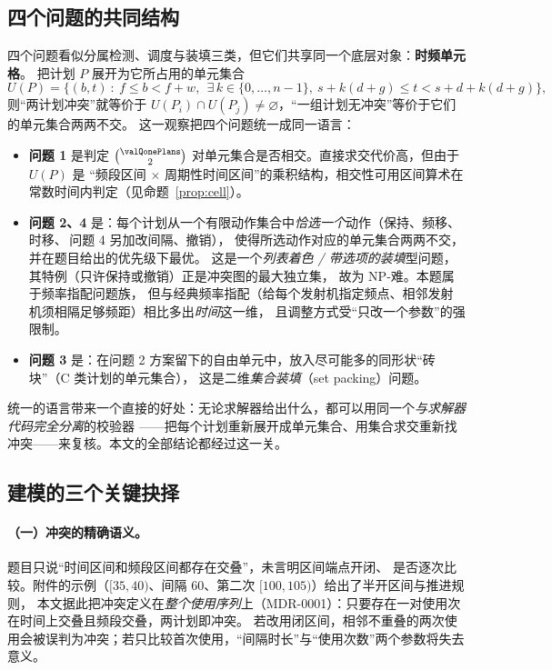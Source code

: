 \subsection{四个问题的共同结构}

四个问题看似分属检测、调度与装填三类，但它们共享同一个底层对象：\textbf{时频单元格}。
把计划 $P$ 展开为它所占用的单元集合
\[
  U(P)=\bigl\{(b,t)\ :\ f\le b<f+w,\ \ \exists\,k\in\{0,\dots,n-1\},\ s+k(d+g)\le t<s+d+k(d+g)\bigr\},
\]
则“两计划冲突”就等价于 $U(P_i)\cap U(P_j)\neq\varnothing$，“一组计划无冲突”等价于它们的单元集合两两不交。
这一观察把四个问题统一成同一语言：

\begin{itemize}[leftmargin=1.6em,itemsep=0.15em]
  \item \textbf{问题 1} 是判定 $\binom{\valQonePlans}{2}$ 对单元集合是否相交。直接求交代价高，但由于 $U(P)$ 是
        “频段区间 $\times$ 周期性时间区间”的乘积结构，相交性可用区间算术在常数时间内判定（见命题~\ref{prop:cell}）。
  \item \textbf{问题 2、4} 是：每个计划从一个有限动作集合中\emph{恰选一个}动作（保持、频移、时移、\,问题 4 另加改间隔、撤销），
        使得所选动作对应的单元集合两两不交，并在题目给出的优先级下最优。
        这是一个\emph{列表着色 / 带选项的装填}型问题，其特例（只许保持或撤销）正是冲突图的最大独立集，
        故为 NP-难\cite{karp1972,garey1979}。本题属于频率指配问题族\cite{hale1980,aardal2007}，
        但与经典频率指配（给每个发射机指定频点、相邻发射机须相隔足够频距）相比多出\emph{时间}这一维，
        且调整方式受“只改一个参数”的强限制。
  \item \textbf{问题 3} 是：在问题 2 方案留下的自由单元中，放入尽可能多的同形状“砖块”（C 类计划的单元集合），
        这是二维\emph{集合装填}（set packing）问题\cite{padberg1973,lodi2002}。
\end{itemize}

统一的语言带来一个直接的好处：无论求解器给出什么，都可以用同一个\emph{与求解器代码完全分离}的校验器
——把每个计划重新展开成单元集合、用集合求交重新找冲突——来复核。本文的全部结论都经过这一关。

\subsection{建模的三个关键抉择}

\paragraph{（一）冲突的精确语义。}题目只说“时间区间和频段区间都存在交叠”，未言明区间端点开闭、
是否逐次比较。附件的示例（$[35,40)$、间隔 $60$、第二次 $[100,105)$）给出了半开区间与推进规则，
本文据此把冲突定义在\emph{整个使用序列}上（MDR-0001）：只要存在一对使用次在时间上交叠且频段交叠，两计划即冲突。
若改用闭区间，相邻不重叠的两次使用会被误判为冲突；若只比较首次使用，“间隔时长”与“使用次数”两个参数将失去意义。

